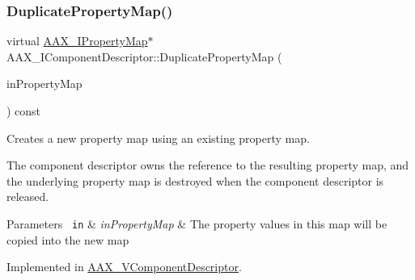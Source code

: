 \subsubsection{\texorpdfstring{DuplicatePropertyMap()}{DuplicatePropertyMap()}}
{\footnotesize\ttfamily virtual \mbox{\hyperlink{a01869}{A\+A\+X\+\_\+\+I\+Property\+Map}}$\ast$ A\+A\+X\+\_\+\+I\+Component\+Descriptor\+::\+Duplicate\+Property\+Map (\begin{DoxyParamCaption}\item[{\mbox{\hyperlink{a01869}{A\+A\+X\+\_\+\+I\+Property\+Map}} $\ast$}]{in\+Property\+Map }\end{DoxyParamCaption}) const\hspace{0.3cm}{\ttfamily [pure virtual]}}



Creates a new property map using an existing property map. 

The component descriptor owns the reference to the resulting property map, and the underlying property map is destroyed when the component descriptor is released.


\begin{DoxyParams}[1]{Parameters}
\mbox{\texttt{ in}}  & {\em in\+Property\+Map} & The property values in this map will be copied into the new map \\
\hline
\end{DoxyParams}


Implemented in \mbox{\hyperlink{a01901_ae6b016afd2eda4c467471695804937be}{A\+A\+X\+\_\+\+V\+Component\+Descriptor}}.

\mbox{\label{a01781_a1c069508cf54a523905c8160ebf628ad}} 
